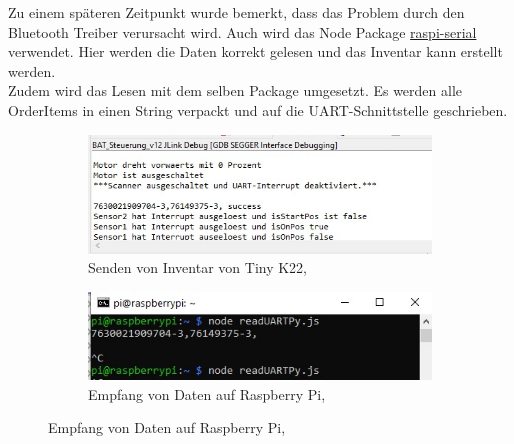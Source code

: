 Zu einem späteren Zeitpunkt wurde bemerkt, dass das Problem durch den Bluetooth Treiber verursacht wird. Auch wird das Node Package \href{https://www.npmjs.com/package/raspi-serial}{raspi-serial} verwendet. Hier werden die Daten korrekt gelesen und das Inventar kann erstellt werden. \\
Zudem wird das Lesen mit dem selben Package umgesetzt. Es werden alle OrderItems in einen String verpackt und auf die \ac{UART}-Schnittstelle geschrieben. 

\begin{figure}[H]
	\begin{subfigure}[b]{0.4\textwidth}
		\includegraphics[scale=0.4]{images/sendUartFromTiny.jpeg}
		\caption[Senden von Inventar von Tiny K22]{Senden von Inventar von Tiny K22, \cite{arnoldPhilip:private}}
		\label{img: sendUart}
	\end{subfigure}
	\hfill
	\begin{subfigure}[b]{0.4\textwidth}
		\includegraphics[scale=0.4]{images/uartRead.jpeg}
		\caption[Empfang von Daten auf Raspberry Pi]{Empfang von Daten auf Raspberry Pi, \cite{arnoldPhilip:private}}
		\label{img: readUART}
	\end{subfigure}
\end{figure} 

